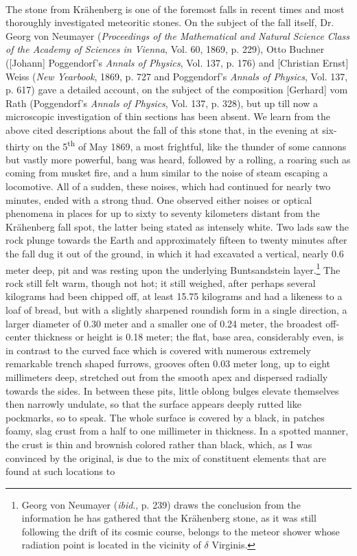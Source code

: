 \documentclass[a4paper, 12pt, oneside]{article}
\begin{document}
\paragraph*{}
The stone from Krähenberg is one of the foremost falls in recent times and most thoroughly investigated meteoritic stones. On the subject of the fall itself, Dr. Georg von Neumayer (\emph{Proceedings of the Mathematical and Natural Science Class of the Academy of Sciences in Vienna}, Vol. 60, 1869, p. 229), Otto Buchner ([Johann] Poggendorf's \emph{Annals of Physics}, Vol. 137, p. 176) and [Christian Ernst] Weiss (\emph{New Yearbook}, 1869, p. 727 and Poggendorf's \emph{Annals of Physics}, Vol. 137, p. 617) gave a detailed account, on the subject of the composition [Gerhard] vom Rath (Poggendorf's \emph{Annals of Physics}, Vol. 137, p. 328), but up till now a microscopic investigation of thin sections has been absent. We learn from the above cited descriptions about the fall of this stone that, in the evening at six-thirty on the 5\textsuperscript{th} of May 1869, a most frightful, like the thunder of some cannons but vastly more powerful, bang was heard, followed by a rolling, a roaring such as coming from musket fire, and a hum similar to the noise of steam escaping a locomotive. All of a sudden, these noises, which had continued for nearly two minutes, ended with a strong thud. One observed either noises or optical phenomena in places for up to sixty to seventy kilometers distant from the Krähenberg fall spot, the latter being stated as intensely white. Two lads saw the rock plunge towards the Earth and approximately fifteen to twenty minutes after the fall dug it out of the ground, in which it had excavated a vertical, nearly 0.6 meter deep, pit and was resting upon the underlying Buntsandstein layer.\footnote{Georg von Neumayer (\emph{ibid}., p. 239) draws the conclusion from the information he has gathered that the Krähenberg stone, as it was still following the drift of its cosmic course, belongs to the meteor shower whose radiation point is located in the vicinity of $\delta$ Virginis.} The rock still felt warm, though not hot; it still weighed, after perhaps several kilograms had been chipped off, at least 15.75 kilograms and had a likeness to a loaf of bread, but with a slightly sharpened roundish form in a single direction, a larger diameter of 0.30 meter and a smaller one of 0.24 meter, the broadest off-center thickness or height is 0.18 meter; the flat, base area, considerably even, is in contrast to the curved face which is covered with numerous extremely remarkable trench shaped furrows, grooves often 0.03 meter long, up to eight millimeters deep, stretched out from the smooth apex and dispersed radially towards the sides.  In between these pits, little oblong bulges elevate themselves then narrowly undulate, so that the surface appears deeply rutted like pockmarks, so to speak. The whole surface is covered by a black, in patches foamy, slag crust from a half to one millimeter in thickness. In a spotted manner, the crust is thin and brownish colored rather than black, which, as I was convinced by the original, is due to the mix of constituent elements that are found at such locations to 
\end{document}
